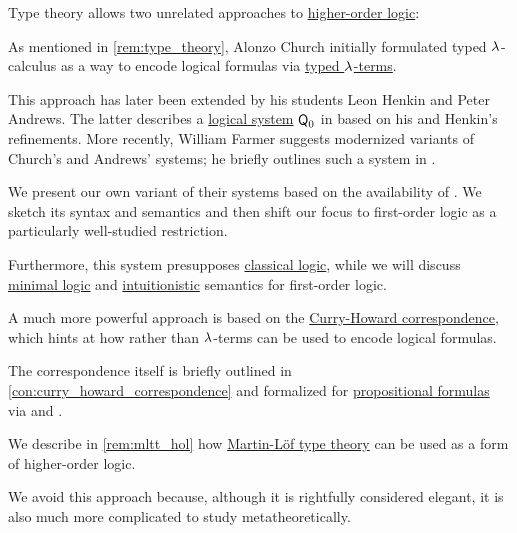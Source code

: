 \begin{remark}\label{rem:higher_order_logic_and_type_theory}
  Type theory allows two unrelated approaches to \hyperref[rem:predicate_logic]{higher-order logic}:
  \begin{thmenum}
     As mentioned in \cref{rem:type_theory}, Alonzo Church initially formulated typed \( {\mathrm \lambda} \)-calculus as a way to encode logical formulas via \hyperref[def:typed_lambda_term]{typed \( {\mathrm \lambda} \)-terms}.

    This approach has later been extended by his students Leon Henkin and Peter Andrews. The latter describes a \hyperref[con:logical_system]{logical system} \( \textsf{Q}_0 \) in \cite[ch. 5]{Andrews2002Logic} based on his and Henkin's refinements. More recently, William Farmer suggests modernized variants of Church's and Andrews' systems; he briefly outlines such a system in \cite{Farmer2008STTVirtues}.

    We present our own variant of their systems based on the availability of . We sketch its syntax and semantics and then shift our focus to first-order logic as a particularly well-studied restriction.

    Furthermore, this system presupposes \hyperref[con:classical_logic]{classical logic}, while we will discuss \hyperref[con:minimal_logic]{minimal logic} and \hyperref[con:intuitionistic_logic]{intuitionistic} semantics for first-order logic.

     A much more powerful approach is based on the \hyperref[con:curry_howard_correspondence]{Curry-Howard correspondence}, which hints at how  rather than \( {\mathrm \lambda} \)-terms can be used to encode logical formulas.

    The correspondence itself is briefly outlined in \cref{con:curry_howard_correspondence} and formalized for \hyperref[def:propositional_syntax/formula]{propositional formulas} via  and .

    We describe in \cref{rem:mltt_hol} how \hyperref[def:mltt]{Martin-L\"of type theory} can be used as a form of higher-order logic.

    We avoid this approach because, although it is rightfully considered elegant, it is also much more complicated to study metatheoretically.
  \end{thmenum}
\end{remark}

